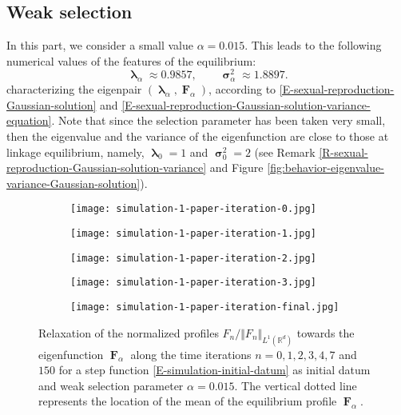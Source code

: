 \documentclass[reqno]{amsart}
\DeclareMathOperator{\blambda}{\boldsymbol{\lambda}}
\DeclareMathOperator{\bsigma}{\boldsymbol{\sigma}}
\DeclareMathOperator{\bF}{\boldsymbol{F}}
\numberwithin{equation}{section}
\begin{document}
{\subsection{Weak selection}

In this part, we consider a small value $\alpha=0.015$. This leads to the following numerical values of the features of the equilibrium:
$$\blambda_\alpha\approx 0.9857,\qquad \bsigma_\alpha^2\approx 1.8897.$$
characterizing the eigenpair $(\blambda_\alpha,\bF_\alpha)$, according to \eqref{E-sexual-reproduction-Gaussian-solution} and \eqref{E-sexual-reproduction-Gaussian-solution-variance-equation}. Note that since the selection parameter has been taken very small, then the eigenvalue and the variance of the eigenfunction are close to those at linkage equilibrium, namely, $\blambda_0=1$ and $\bsigma_0^2=2$ (see Remark \ref{R-sexual-reproduction-Gaussian-solution-variance} and Figure \ref{fig:behavior-eigenvalue-variance-Gaussian-solution}).

\begin{figure}
\centering
\begin{subfigure}[t]{0.49\textwidth}
\centering
\texttt{[image: simulation-1-paper-iteration-0.jpg]}
\end{subfigure}
\begin{subfigure}[t]{0.49\textwidth}
\centering
\texttt{[image: simulation-1-paper-iteration-1.jpg]}
\end{subfigure}
\begin{subfigure}[t]{0.49\textwidth}
\centering
\texttt{[image: simulation-1-paper-iteration-2.jpg]}
\end{subfigure}
\begin{subfigure}[t]{0.49\textwidth}
\centering
\texttt{[image: simulation-1-paper-iteration-3.jpg]}
\end{subfigure}
\begin{subfigure}[t]{0.55\textwidth}
\centering
\texttt{[image: simulation-1-paper-iteration-final.jpg]}
\end{subfigure}
\caption{Relaxation of the normalized profiles $F_n/\Vert F_n\Vert_{L^1(\mathbb{R}^d)}$ towards the eigenfunction $\bF_\alpha$ along the time iterations $n=0,1,2,3,4,7$ and $150$ for a step function \eqref{E-simulation-initial-datum} as initial datum and weak selection parameter $\alpha=0.015$. The vertical dotted line represents the location of the mean of the equilibrium profile $\bF_\alpha$.}
\label{fig:simulation-1-profiles}
\end{figure}

}
\end{document}
